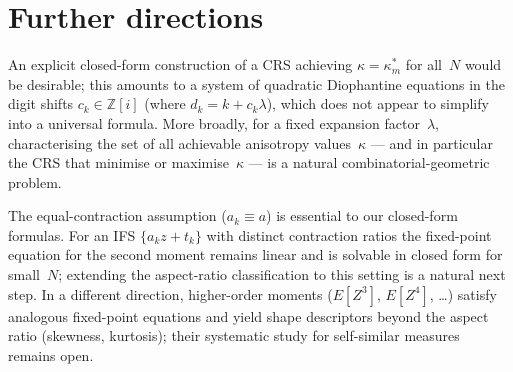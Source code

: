 \documentclass{amsart}
\theoremstyle{definition}
\theoremstyle{remark}
\begin{document}
\section{Further directions}

An explicit closed-form construction of a CRS
achieving $\kappa=\kappa_m^*$ for all~$N$ would be desirable;
this amounts to a system of quadratic Diophantine equations
in the digit shifts $c_k\in\mathbb{Z}[i]$
(where $d_k = k + c_k\lambda$), which does not appear to simplify
into a universal formula.
More broadly, for a fixed expansion factor~$\lambda$,
characterising the set of all achievable anisotropy values~$\kappa$
--- and in particular the CRS that minimise or maximise~$\kappa$
--- is a natural combinatorial-geometric problem.

The equal-contraction assumption ($a_k \equiv a$) is essential to our
closed-form formulas.  For an IFS $\{a_k z + t_k\}$ with distinct
contraction ratios the fixed-point equation for the second moment
remains linear and is solvable in closed form for small~$N$;
extending the aspect-ratio classification to this setting is a natural
next step.
In a different direction, higher-order moments ($E[Z^3]$, $E[Z^4]$, \ldots)
satisfy analogous fixed-point equations and yield shape descriptors
beyond the aspect ratio (skewness, kurtosis);
their systematic study for self-similar measures remains open.
\end{document}
